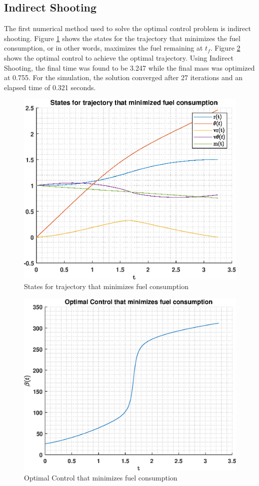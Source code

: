 \documentclass[]{article}
\begin{document}
\subsection{Indirect Shooting}
The first numerical method used to solve the optimal control problem is indirect shooting. Figure \ref{fig:indirectStates} shows the states for the trajectory that minimizes the fuel consumption, or in other words, maximizes the fuel remaining at \(t_f\). Figure \ref{fig:indirectControl} shows the optimal control to achieve the optimal trajectory. Using Indirect Shooting, the final time was found to be 3.247 while the final mass was optimized at 0.755. For the simulation, the solution converged after 27 iterations and an elapsed time of 0.321 seconds.
\begin{figure}[hbt!]
	\centering
	\includegraphics[scale=0.75]{indirectStates.eps}
    \caption{States for trajectory that minimizes fuel consumption}
	\label{fig:indirectStates}
\end{figure}
\begin{figure}
	\centering
	\includegraphics[scale=0.75]{indirectControl.eps}
	\caption{Optimal Control that minimizes fuel consumption}
	\label{fig:indirectControl}
\end{figure}
\end{document}

